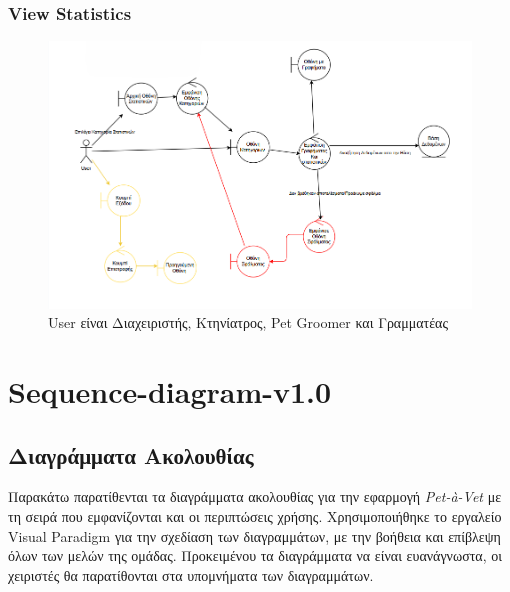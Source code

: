 \documentclass[12pt,a4paper,twoside]{book}
\begin{document}
\subsection{View Statistics}
\begin{figure}[H]
    \centering
    \includegraphics[width=\textwidth]{Resources/Robustness Diagram/Statistics.png}
    \caption{User είναι Διαχειριστής, Κτηνίατρος, Pet Groomer και Γραμματέας}\label{fig:robustness-view-statistics}
\end{figure}

\chapter{Sequence-diagram-v1.0}

\section{Διαγράμματα Ακολουθίας}

Παρακάτω παρατίθενται τα διαγράμματα ακολουθίας για την εφαρμογή \textit{Pet-à-Vet} με τη σειρά που εμφανίζονται και οι περιπτώσεις χρήσης. Χρησιμοποιήθηκε το εργαλείο Visual Paradigm για την σχεδίαση των διαγραμμάτων, με την βοήθεια και επίβλεψη όλων των μελών της ομάδας. Προκειμένου τα διαγράμματα να είναι ευανάγνωστα, οι χειριστές θα παρατίθονται στα υπομνήματα των διαγραμμάτων. %
\end{document}
